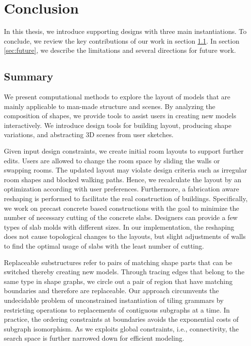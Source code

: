 

\chapter{Conclusion}
\label{chapter:conclusion}

In this thesis, we introduce supporting designs with three main instantiations. To conclude, we review the key contributions of our work in section \ref{sec:summary}. In section \ref{sec:future}, we describe the limitations and several directions for future work.

\section{Summary}
\label{sec:summary}

We present computational methods to explore the layout of models that are mainly applicable to man-made structure and scenes. By analyzing the composition of shapes, we provide tools to assist users in creating new models interactively. We introduce design tools for building layout, producing shape variations, and abstracting 3D scenes from user sketches.

 Given input design constraints, we create initial room layouts to support further edits. Users are allowed to change the room space by sliding the walls or swapping rooms. The updated layout may violate design criteria such as irregular room shapes and blocked walking paths. Hence, we recalculate the layout by an optimization according with user preferences. Furthermore, a fabrication aware reshaping is performed to facilitate the real construction of buildings. Specifically, we work on precast concrete based constructions with the goal to minimize the number of necessary cutting of the concrete slabs. Designers can provide a few types of slab molds with different sizes. In our implementation, the reshaping does not cause topological changes to the layouts, but slight adjustments of walls to find the optimal usage of slabs with the least number of cutting.


%
Replaceable substructures refer to pairs of matching shape parts that can be switched thereby creating new models. Through tracing edges that belong to the same type in shape graphs, we circle out a pair of region that have matching boundaries and therefore are replaceable. Our approach circumvents the undecidable problem of unconstrained instantiation of tiling grammars by restricting operations to replacements of contiguous subgraphs at a time. In practice, the ordering constraints at boundaries avoids the exponential costs of subgraph isomorphism. As we exploits global constraints, i.e., connectivity, the search space is further narrowed down for efficient modeling.

